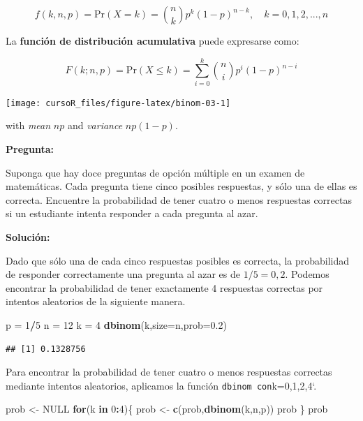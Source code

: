 \documentclass[]{book}
\newenvironment{Shaded}{\begin{snugshade}}{\end{snugshade}}
\newcommand{\KeywordTok}[1]{\textcolor[rgb]{0.13,0.29,0.53}{\textbf{#1}}}
\newcommand{\DataTypeTok}[1]{\textcolor[rgb]{0.13,0.29,0.53}{#1}}
\newcommand{\DecValTok}[1]{\textcolor[rgb]{0.00,0.00,0.81}{#1}}
\newcommand{\FloatTok}[1]{\textcolor[rgb]{0.00,0.00,0.81}{#1}}
\newcommand{\StringTok}[1]{\textcolor[rgb]{0.31,0.60,0.02}{#1}}
\newcommand{\OtherTok}[1]{\textcolor[rgb]{0.56,0.35,0.01}{#1}}
\newcommand{\ControlFlowTok}[1]{\textcolor[rgb]{0.13,0.29,0.53}{\textbf{#1}}}
\newcommand{\OperatorTok}[1]{\textcolor[rgb]{0.81,0.36,0.00}{\textbf{#1}}}
\newcommand{\NormalTok}[1]{#1}
\begin{document}
\[
{
f(k,n,p) = \mbox{Pr}(X=k)=\binom{n}{k} p^k (1-p)^{n-k}, \quad k=0,1,2,...,n
}
\]

La \textbf{función de distribución acumulativa} puede expresarse como:

\[
{
F(k;n,p) = \mbox{Pr}(X\leq k) = \sum_{i=0}^{k}\binom{n}{i} p^i (1-p)^{n-i}
}
\]

\begin{center}\texttt{[image: cursoR\_files/figure-latex/binom-03-1]} \end{center}

with \emph{mean} \(np\) and \emph{variance} \(np(1-p)\).

\textbf{Pregunta:}

Suponga que hay doce preguntas de opción múltiple en un examen de
matemáticas. Cada pregunta tiene cinco posibles respuestas, y sólo una
de ellas es correcta. Encuentre la probabilidad de tener cuatro o menos
respuestas correctas si un estudiante intenta responder a cada pregunta
al azar.

\textbf{Solución:}

Dado que sólo una de cada cinco respuestas posibles es correcta, la
probabilidad de responder correctamente una pregunta al azar es de
\(1/5=0,2\). Podemos encontrar la probabilidad de tener exactamente 4
respuestas correctas por intentos aleatorios de la siguiente manera.

\begin{Shaded}
\begin{Highlighting}[]
\NormalTok{p =}\StringTok{ }\DecValTok{1}\OperatorTok{/}\DecValTok{5}
\NormalTok{n =}\StringTok{ }\DecValTok{12}
\NormalTok{k =}\StringTok{ }\DecValTok{4}
\KeywordTok{dbinom}\NormalTok{(k,}\DataTypeTok{size=}\NormalTok{n,}\DataTypeTok{prob=}\FloatTok{0.2}\NormalTok{)}
\end{Highlighting}
\end{Shaded}

\begin{verbatim}
## [1] 0.1328756
\end{verbatim}

Para encontrar la probabilidad de tener cuatro o menos respuestas
correctas mediante intentos aleatorios, aplicamos la función
\texttt{dbinom\textquotesingle{}\ con}k=0,1,2,4`.

\begin{Shaded}
\begin{Highlighting}[]
\NormalTok{prob <-}\StringTok{ }\OtherTok{NULL}
\ControlFlowTok{for}\NormalTok{(k }\ControlFlowTok{in} \DecValTok{0}\OperatorTok{:}\DecValTok{4}\NormalTok{)\{}
\NormalTok{prob <-}\StringTok{ }\KeywordTok{c}\NormalTok{(prob,}\KeywordTok{dbinom}\NormalTok{(k,n,p))}
\NormalTok{prob}
\NormalTok{\}}
\NormalTok{prob}
\end{Highlighting}
\end{Shaded}
\end{document}
